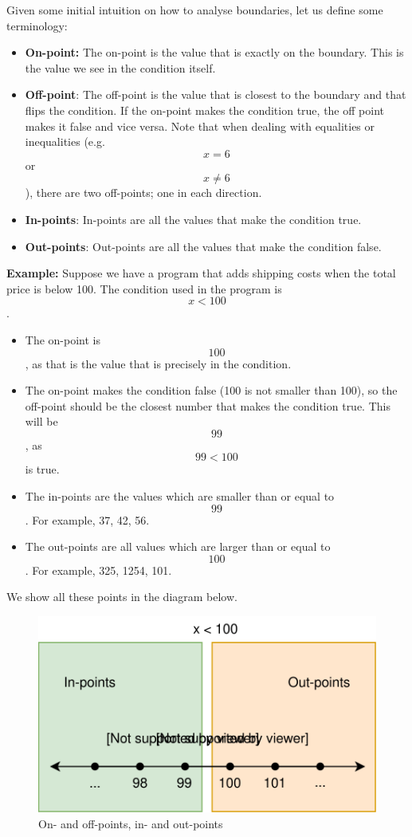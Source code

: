 Given some initial intuition on how to analyse boundaries, let us define
some terminology:

\begin{itemize}
\tightlist
\item
  \textbf{On-point:} The on-point is the value that is exactly on the
  boundary. This is the value we see in the condition itself.
\item
  \textbf{Off-point}: The off-point is the value that is closest to the
  boundary and that flips the condition. If the on-point makes the
  condition true, the off point makes it false and vice versa. Note that
  when dealing with equalities or inequalities (e.g.~\[x = 6\] or
  \[x \neq 6\]), there are two off-points; one in each direction.
\item
  \textbf{In-points}: In-points are all the values that make the
  condition true.
\item
  \textbf{Out-points}: Out-points are all the values that make the
  condition false.
\end{itemize}

\textbf{Example:} Suppose we have a program that adds shipping costs
when the total price is below 100. The condition used in the program is
\[x < 100\].

\begin{itemize}
\tightlist
\item
  The on-point is \[100\], as that is the value that is precisely in the
  condition.
\item
  The on-point makes the condition false (100 is not smaller than 100),
  so the off-point should be the closest number that makes the condition
  true. This will be \[99\], as \[99 < 100\] is true.
\item
  The in-points are the values which are smaller than or equal to
  \[99\]. For example, 37, 42, 56.
\item
  The out-points are all values which are larger than or equal to
  \[100\]. For example, 325, 1254, 101.
\end{itemize}

We show all these points in the diagram below.

\begin{figure}
\centering
\includegraphics{img/boundary-testing/examples/on_off_points.svg}
\caption{On- and off-points, in- and out-points}
\end{figure}


